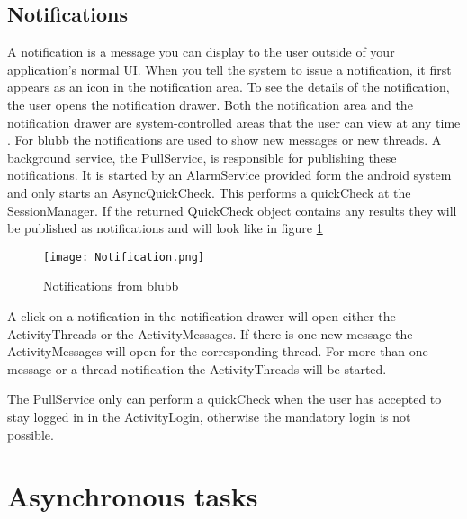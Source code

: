 \documentclass[12pt,a4paper,oneside]{report}
\newcommand{\appname}{blubb}
\begin{document}
\subsection{Notifications} \label{subsec:notifications}
A notification is a message you can display to the user outside of your application's normal UI. When you tell the system to issue a notification, it first appears as an icon in the notification area. To see the details of the notification, the user opens the notification drawer. Both the notification area and the notification drawer are system-controlled areas that the user can view at any time \citep{aDefNotifications}.
For \appname{} the notifications are used to show new messages or new threads. A background service, the PullService, is responsible for publishing these notifications. It is started by an AlarmService provided form the android system and only starts an AsyncQuickCheck. This performs a quickCheck at the SessionManager. If the returned QuickCheck object contains any results they will be published as notifications and will look like in figure \ref{fig:notifications}

\begin{figure}[!ht]
    \texttt{[image: Notification.png]}
	\caption{Notifications from \appname{}} 
	\label{fig:notifications}
\end{figure}

A click on a notification in the notification drawer will open either the ActivityThreads or the ActivityMessages. If there is one new message the ActivityMessages will open for the corresponding thread. For more than one message or a thread notification the ActivityThreads will be started.

The PullService only can perform a quickCheck when the user has accepted to stay logged in in the ActivityLogin, otherwise the mandatory login is not possible.

\section{Asynchronous tasks} \label{sec:AsyncTasks}
\end{document}
